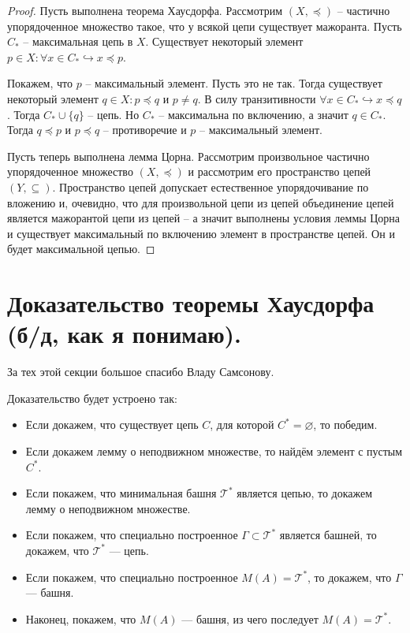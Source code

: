 \begin{proof}
    Пусть выполнена теорема Хаусдорфа.
    Рассмотрим $(X, \preceq)$ -- частично упорядоченное множество такое, что у всякой цепи существует мажоранта.
    Пусть $C_*$ -- максимальная цепь в $X$.
    Существует некоторый элемент $p \in X\colon \forall x \in C_* \hookrightarrow x \preceq p$.

    Покажем, что $p$ -- максимальный элемент.
    Пусть это не так.
    Тогда существует некоторый элемент $q \in X\colon p \preceq q$ и $p \neq q$.
    В силу транзитивности $\forall x \in C_* \hookrightarrow x \preceq q$.
    Тогда $C_* \cup \{q\}$ -- цепь.
    Но $C_*$ -- максимальна по включению, а значит $q \in C_*$.
    Тогда $q \preceq p$ и $p \preceq q$ -- противоречие и $p$ -- максимальный элемент.

    Пусть теперь выполнена лемма Цорна.
    Рассмотрим произвольное частично упорядоченное множество $(X, \preceq)$ и рассмотрим его пространство цепей $(Y, \subseteq)$.
    Пространство цепей допускает естественное упорядочивание по вложению и, очевидно, что для произвольной цепи из цепей объединение цепей является мажорантой цепи из цепей -- а значит выполнены условия леммы Цорна и существует максимальный по включению элемент в пространстве цепей.
    Он и будет максимальной цепью. %
\end{proof}

\section{Доказательство теоремы Хаусдорфа (б/д, как я понимаю).}
\begin{notet}
    За тех этой секции большое спасибо Владу Самсонову.
\end{notet}

Доказательство будет устроено так:
\begin{itemize}
    \item Если докажем, что существует цепь $C$, для которой $C^{*}=\varnothing$, то победим.
    \item Если докажем лемму о неподвижном множестве, то найдём элемент с пустым $C^{*}$.
    \item Если покажем, что минимальная башня $\mathcal T^{*}$ является цепью, то докажем лемму о неподвижном множестве.
    \item Если покажем, что специально построенное $\Gamma\subset\mathcal T^{*}$ является башней, то докажем, что $\mathcal T^{*}$ --- цепь.
    \item Если покажем, что специально построенное $M(A)=\mathcal T^{*}$, то докажем, что $\Gamma$ --- башня.
    \item Наконец, покажем, что $M(A)$ --- башня, из чего последует $M(A)=\mathcal T^{*}$.
\end{itemize}

